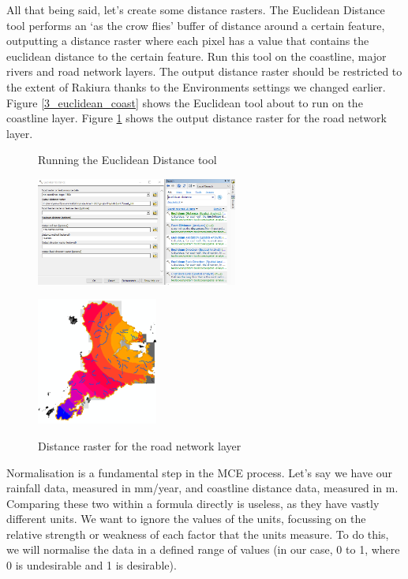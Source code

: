 \documentclass{article}
\begin{document}
All that being said, let's create some distance rasters. The Euclidean Distance tool performs an `as the crow flies' buffer of distance around a certain feature, outputting a distance raster where each pixel has a value that contains the euclidean distance to the certain feature. Run this tool on the coastline, major rivers and road network layers. The output distance raster should be restricted to the extent of Rakiura thanks to the Environments settings we changed earlier. Figure \ref{3_euclidean_coast} shows the Euclidean tool about to run on the coastline layer. Figure \ref{3_euclidean_road_output} shows the output distance raster for the road network layer.\\

\begin{figure}[h]
  \centering
  \begin{minipage}[b]{0.4\textwidth}
    \centering
    \caption{Running the Euclidean Distance tool}
    \includegraphics[width=250px]{images/part3/euclidean_coast.PNG}
    \label{3_euclidean_coast}
  \end{minipage}
  \hfill
  \begin{minipage}[b]{0.4\textwidth}
    \centering
    \caption{Distance raster for the road network layer}
    \includegraphics[width=150px]{images/part3/euclidean_road_output.PNG}
    \label{3_euclidean_road_output}
  \end{minipage}
\end{figure}
\pagebreak

Normalisation is a fundamental step in the MCE process. Let's say we have our rainfall data, measured in mm/year, and coastline distance data, measured in m. Comparing these two within a formula directly is useless, as they have vastly different units. We want to ignore the values of the units, focussing on the relative strength or weakness of each factor that the units measure. To do this, we will normalise the data in a defined range of values (in our case, 0 to 1, where 0 is undesirable and 1 is desirable). \\
\end{document}
